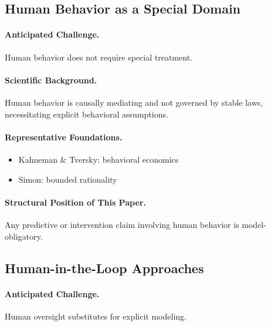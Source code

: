 \subsection{Human Behavior as a Special Domain}

\paragraph{Anticipated Challenge.}
Human behavior does not require special treatment.

\paragraph{Scientific Background.}
Human behavior is causally mediating and not governed by stable laws, necessitating explicit behavioral assumptions.

\paragraph{Representative Foundations.}
\begin{itemize}
    \item Kahneman \& Tversky: behavioral economics
    \item Simon: bounded rationality
\end{itemize}

\paragraph{Structural Position of This Paper.}
Any predictive or intervention claim involving human behavior is model-obligatory.


\subsection{Human-in-the-Loop Approaches}

\paragraph{Anticipated Challenge.}
Human oversight substitutes for explicit modeling.

